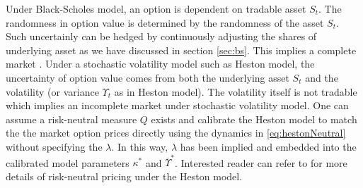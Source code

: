 \documentclass[letterpaper,12pt,titlepage,oneside,final]{book}
\numberwithin{equation}{section}
\theoremstyle{definition}
\begin{document}
Under Black-Scholes model, an option is dependent on tradable asset $S_t$. The randomness in option value is determined by the randomness of the asset $S_t$. Such uncertainly can be hedged by continuously adjusting the shares of underlying asset as we have discussed in  section \ref{sec:bs}. This implies a complete market \cite{shreve2004stochastic}.
Under a stochastic volatility model such as Heston model, the uncertainty of option value comes from both the underlying asset $S_t$ and the volatility (or variance $\Upsilon_t$ as in Heston model). The volatility itself is not tradable which implies an incomplete market under stochastic volatility model. 
One can assume a risk-neutral measure $Q$ exists and calibrate the Heston model to match the the market option prices directly using the dynamics in \eqref{eq:hestonNeutral} without specifying the $\lambda$. In this way, $\lambda$ has been implied and embedded into the calibrated model parameters $\kappa^*$ and $\overline{\Upsilon}^*$. Interested reader can refer to \cite{heston1993closed,gatheral2011volatility} for more details of risk-neutral pricing under the Heston model.

\end{document}
